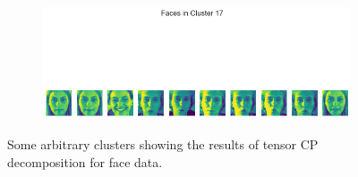 \begin{figure}[H]
\begin{subfigure}[b]{0.45\textwidth}
    \end{subfigure}
    \hfill
    \begin{subfigure}[b]{0.45\textwidth}
        \includegraphics[width=\textwidth]{presentation/figures-face-results/face17.png}
    \end{subfigure}
    \caption{Some arbitrary clusters showing the results of tensor CP decomposition for face data.}
    \end{figure} 
    